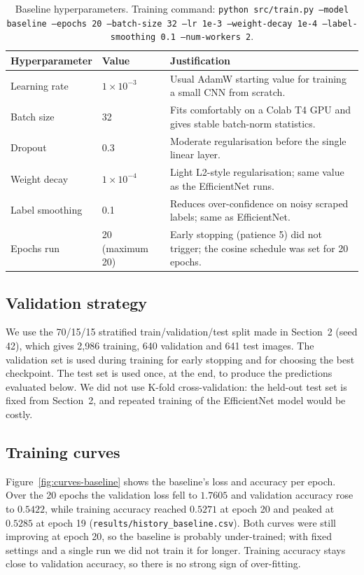 \begin{table}[H]
  \centering
  \begin{tabular}{|l|l|p{7.2cm}|}
    \hline
    \textbf{Hyperparameter} & \textbf{Value} & \textbf{Justification} \\ \hline
    Learning rate & $1 \times 10^{-3}$ & Usual AdamW starting value for training a small CNN from scratch. \\ \hline
    Batch size & 32 & Fits comfortably on a Colab T4 GPU and gives stable batch-norm statistics. \\ \hline
    Dropout & 0.3 & Moderate regularisation before the single linear layer. \\ \hline
    Weight decay & $1 \times 10^{-4}$ & Light L2-style regularisation; same value as the EfficientNet runs. \\ \hline
    Label smoothing & 0.1 & Reduces over-confidence on noisy scraped labels; same as EfficientNet. \\ \hline
    Epochs run & 20 (maximum 20) & Early stopping (patience 5) did not trigger; the cosine schedule was set for 20 epochs. \\ \hline
  \end{tabular}
  \caption{Baseline hyperparameters. Training command:
  \texttt{python src/train.py --model baseline --epochs 20 --batch-size 32
  --lr 1e-3 --weight-decay 1e-4 --label-smoothing 0.1 --num-workers 2}.}
\end{table}

\subsection{Validation strategy}
We use the 70/15/15 stratified train/validation/test split made in Section~2
(seed 42), which gives 2,986 training, 640 validation and 641 test images.
The validation set is used during training for early stopping and for
choosing the best checkpoint. The test set is used once, at the end, to
produce the predictions evaluated below. We did not use K-fold
cross-validation: the held-out test set is fixed from Section~2, and
repeated training of the EfficientNet model would be costly.

\subsection{Training curves}
Figure~\ref{fig:curves-baseline} shows the baseline's loss and accuracy per
epoch. Over the 20 epochs the validation loss fell to $1.7605$ and
validation accuracy rose to $0.5422$, while training accuracy reached
$0.5271$ at epoch 20 and peaked at $0.5285$ at epoch 19
(\texttt{results/history\_baseline.csv}). Both curves were still
improving at epoch 20, so the baseline is probably under-trained; with
fixed settings and a single run we did not train it for longer. Training
accuracy stays close to validation accuracy, so there is no strong sign
of over-fitting.

